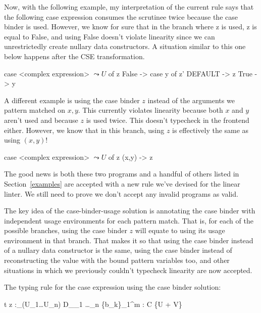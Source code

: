 \documentclass[a4paper, draft]{article}
\begin{document}
Now, with the following example, my interpretation of the current rule says that
the following case expression consumes the scrutinee twice because the case
binder is used. However, we know for sure that in the branch where z is used, z
is equal to False, and using False doesn't violate linearity since we can
unrestrictedly create nullary data constructors. A situation similar to this one
below happens after the CSE transformation.
\begin{code}
    case <complex expression> $\leadsto U$ of z {
        False -> case y of z' { DEFAULT -> z }
        True  -> y
    }

A different example is using the case binder $z$ instead of the arguments we
pattern matched on $x,y$. This currently violates linearity because both $x$ and
$y$ aren't used and because $z$ is used twice. This doesn't typecheck in the
frontend either. However, we know that in this branch, using $z$ is effectively
the same as using $(x,y)$!
\begin{code}
    case <complex expression> $\leadsto U$ of z {
        (x,y) -> z
    }
\end{code}

The good news is both these two programs and a handful of others listed in
Section~\ref{examples} are accepted with a new rule we've devised for the
linear linter. We still need to prove we don't accept any invalid programs as
valid.

The key idea of the case-binder-usage solution is annotating the case binder
with independent usage environments for each pattern match. That is, for
each of the possible branches, using the case binder $z$ will equate to
using its usage environment in that branch. That makes it so that using the
case binder instead of a nullary data constructor is the same, using the case
binder instead of reconstructing the value with the bound pattern variables too,
and other situations in which we previously couldn't typecheck linearity are
now accepted.

The typing rule for the case expression using the case binder solution:

\begin{mathparpagebreakable}
    {\Gamma \vdash {} t  z :_{(U_1\dots U_n)} D_{\pi_1 \dots \pi_n} \{b_k\}_1^m : C \leadsto \{U + V\}}
\end{mathparpagebreakable}



\end{code}
\end{document}
